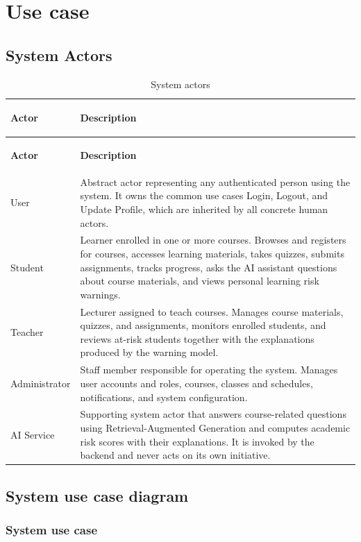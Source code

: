 \section{Use case}
\subsection{System Actors}

{
\renewcommand{\arraystretch}{1.2}
\begin{longtable}{|>{\bfseries\raggedright\arraybackslash}p{}|>{\raggedright\arraybackslash}p{}|}
\caption{System actors}\label{tab:system-actors}\\
\hline
\textbf{Actor} & \textbf{Description} \\ \hline
\endfirsthead
\hline
\textbf{Actor} & \textbf{Description} \\ \hline
\endhead
User & Abstract actor representing any authenticated person using the system. It owns the common use cases Login, Logout, and Update Profile, which are inherited by all concrete human actors. \\ \hline
Student & Learner enrolled in one or more courses. Browses and registers for courses, accesses learning materials, takes quizzes, submits assignments, tracks progress, asks the AI assistant questions about course materials, and views personal learning risk warnings. \\ \hline
Teacher & Lecturer assigned to teach courses. Manages course materials, quizzes, and assignments, monitors enrolled students, and reviews at-risk students together with the explanations produced by the warning model. \\ \hline
Administrator & Staff member responsible for operating the system. Manages user accounts and roles, courses, classes and schedules, notifications, and system configuration. \\ \hline
AI Service & Supporting system actor that answers course-related questions using Retrieval-Augmented Generation and computes academic risk scores with their explanations. It is invoked by the backend and never acts on its own initiative. \\ \hline
\end{longtable}
}

\subsection{System use case diagram}

\subsubsection{System use case}

